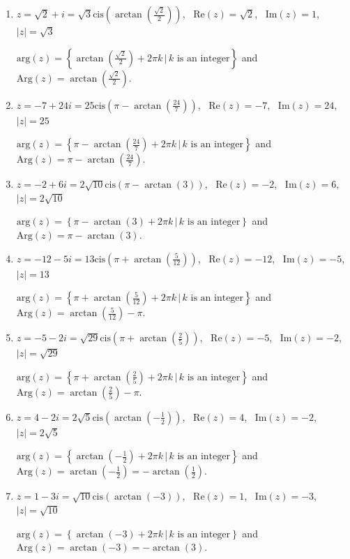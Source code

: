 \begin{enumerate}
\item $z = \sqrt{2}+i = \sqrt{3}\text{cis}\left(\arctan\left(\frac{\sqrt{2}}{2}\right)\right)$, \, $\text{Re}(z) = \sqrt{2}$, \, $\text{Im}(z) = 1$, \, $|z| = \sqrt{3}$

$\text{arg}(z) = \left\{\arctan\left(\frac{\sqrt{2}}{2}\right) + 2\pi k \, | \, \text{$k$ is an integer} \right\}$ and $\text{Arg}(z) =\arctan\left(\frac{\sqrt{2}}{2}\right) $.

\item $z = -7 + 24i = 25\text{cis}\left(\pi - \arctan\left(\frac{24}{7}\right)\right)$, \, $\text{Re}(z) = -7$, \, $\text{Im}(z) = 24$, \, $|z| = 25$

$\text{arg}(z) = \left\{\pi - \arctan\left(\frac{24}{7}\right) + 2\pi k \, | \, \text{$k$ is an integer} \right\}$ and $\text{Arg}(z) =\pi - \arctan\left(\frac{24}{7}\right) $.

\item $z = -2 + 6i = 2\sqrt{10}\text{cis}\left(\pi - \arctan\left(3\right)\right)$, \, $\text{Re}(z) = -2$, \, $\text{Im}(z) = 6$, \, $|z| =2\sqrt{10}$

$\text{arg}(z) = \left\{\pi - \arctan\left(3\right) + 2\pi k \, | \, \text{$k$ is an integer} \right\}$ and $\text{Arg}(z) =\pi - \arctan\left(3\right) $.

\item $z = -12 -5i = 13\text{cis}\left(\pi + \arctan\left(\frac{5}{12}\right)\right)$, \, $\text{Re}(z) = -12$, \, $\text{Im}(z) = -5$, \, $|z| = 13$

$\text{arg}(z) = \left\{\pi +\arctan\left(\frac{5}{12}\right) + 2\pi k \, | \, \text{$k$ is an integer} \right\}$ and $\text{Arg}(z) =  \arctan\left(\frac{5}{12}\right) -\pi $.

\item $z = -5-2i = \sqrt{29}\text{cis}\left(\pi + \arctan\left(\frac{2}{5}\right)\right)$, \, $\text{Re}(z) = -5$, \, $\text{Im}(z) = -2$, \, $|z| = \sqrt{29}$

$\text{arg}(z) = \left\{\pi +\arctan\left(\frac{2}{5}\right) + 2\pi k \, | \, \text{$k$ is an integer} \right\}$ and $\text{Arg}(z) =  \arctan\left(\frac{2}{5}\right) -\pi $.

\item $z =4-2i = 2\sqrt{5}\text{cis}\left(\arctan\left(-\frac{1}{2}\right)\right)$, \, $\text{Re}(z) =4$, \, $\text{Im}(z) = -2$, \, $|z| = 2\sqrt{5}$

$\text{arg}(z) = \left\{\arctan\left(-\frac{1}{2}\right) + 2\pi k \, | \, \text{$k$ is an integer} \right\}$ and $\text{Arg}(z) = \arctan\left(-\frac{1}{2}\right) = -\arctan\left(\frac{1}{2}\right) $.

\item $z =1-3i = \sqrt{10}\text{cis}\left(\arctan\left(-3\right)\right)$, \, $\text{Re}(z) =1$, \, $\text{Im}(z) = -3$, \, $|z| =\sqrt{10}$

$\text{arg}(z) = \left\{\arctan\left(-3\right) + 2\pi k \, | \, \text{$k$ is an integer} \right\}$ and $\text{Arg}(z) =  \arctan\left(-3\right) = -\arctan(3)$.

\setcounter{HW}{\value{enumi}}

\end{enumerate}

